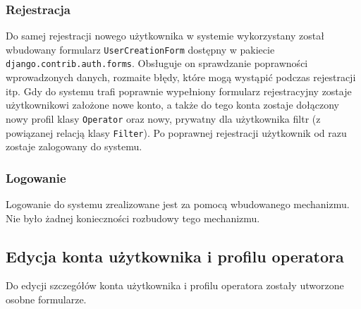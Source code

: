 \documentclass[]{mgr}
\begin{document}
                \subsubsection{Rejestracja}
                Do samej rejestracji nowego użytkownika w systemie wykorzystany został wbudowany formularz \texttt{UserCreationForm} dostępny w pakiecie \texttt{django.contrib.auth.forms}. Obsługuje on sprawdzanie poprawności wprowadzonych danych, rozmaite błędy, które mogą wystąpić podczas rejestracji itp. Gdy do systemu trafi poprawnie wypełniony formularz rejestracyjny zostaje użytkownikowi założone nowe konto, a także do tego konta zostaje dołączony nowy profil klasy \texttt{Operator} oraz nowy, prywatny dla użytkownika filtr (z powiązanej relacją klasy \texttt{Filter}). Po poprawnej rejestracji użytkownik od razu zostaje zalogowany do systemu.

                \subsubsection{Logowanie}
                Logowanie do systemu zrealizowane jest za pomocą wbudowanego mechanizmu. Nie było żadnej konieczności rozbudowy tego mechanizmu.

            \subsection{Edycja konta użytkownika i profilu operatora}
            Do edycji szczegółów konta użytkownika i profilu operatora zostały utworzone osobne formularze.
\end{document}
